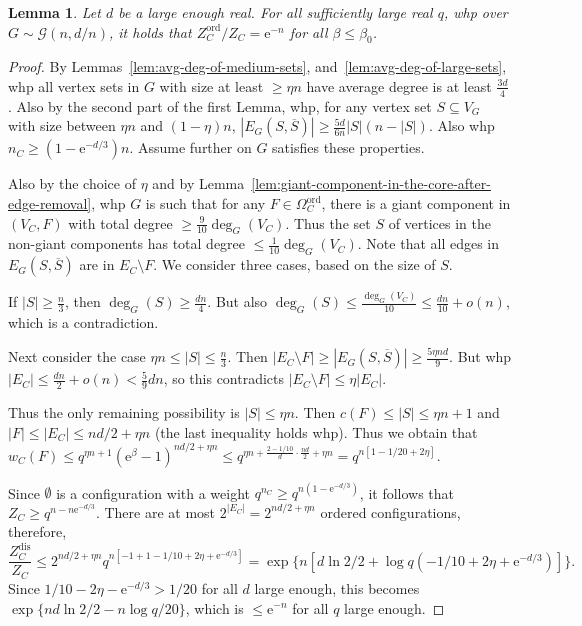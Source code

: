 \documentclass[11pt]{article}
\theoremstyle{plain}
\newtheorem{lemma}[theorem]{Lemma}
\newcommand{\G}{\mathcal{G}}
\newcommand{\emm}{\mathrm{e}}
\newcommand{\1}{\mathbb{1}}
\newcommand{\ord}{\mathrm{ord}}
\newcommand{\dis}{\mathrm{dis}}
\begin{document}
\begin{lemma}\label{lem:ordered-phase-vanishes}
    Let \(d\) be a large enough real. For all sufficiently large real \(q\), whp over \(G\sim\G(n,d/n)\), it holds that \(Z^\ord_C / Z_C = \emm^{-n}\) for all \(\beta \leq \beta_0\).
\end{lemma}
\begin{proof}
    By Lemmas~\ref{lem:avg-deg-of-medium-sets}, and~\ref{lem:avg-deg-of-large-sets}, whp all vertex sets in \(G\) with size at least \(\geq \eta n\) have average degree is at least \(\tfrac{3d}{4}\). Also by the second part of the first Lemma, whp, for any vertex set \(S\subseteq V_G\) with size between \(\eta n\) and \((1-\eta)n\), \(|E_G(S,\overline S)|\geq \frac{5d}{6n}|S|(n-|S|)\). Also whp \(n_C \geq (1-\emm^{-d/3})n\).
    Assume further on \(G\) satisfies these properties.
    
    Also by the choice of \(\eta\) and by Lemma~\ref{lem:giant-component-in-the-core-after-edge-removal}, whp \(G\) is such that for any \(F\in\Omega^\ord_C\), there is a giant component in \((V_C,F)\) with total degree \(\geq \tfrac{9}{10} \deg_G(V_C)\). Thus the set \(S\) of vertices in the non-giant components has total degree \(\leq\tfrac{1}{10}\deg_G(V_C)\). Note that all edges in \(E_G(S,\overline S)\) are in \(E_C\setminus F\).
    We consider three cases, based on the size of \(S\).
    
    If \(|S|\geq\frac{n}{3}\), then \(\deg_G(S)\geq \frac{dn}{4}\). But also \(\deg_G(S)\leq \tfrac{\deg_G(V_C)}{10} \leq \tfrac{dn}{10} + o(n)\), which is a contradiction.

    Next consider the case \(\eta n \leq |S|\leq \tfrac n3\). Then \(|E_C\setminus F|\geq |E_G(S,\overline{S})| \geq \frac{5\eta n d}{9}\). But whp \(|E_C|\leq \frac{dn}{2} + o(n) < \frac{5}{9}dn\), so this contradicts \(|E_C\setminus F|\leq \eta |E_C|\).

    Thus the only remaining possibility is \(|S|\leq\eta n\). Then \(c(F)\leq |S| \leq \eta n + 1\) and \(|F|\leq |E_C|\leq nd/2 + \eta n\) (the last inequality holds whp). Thus we obtain that \(w_C(F)\leq q^{\eta n + 1}(\emm^\beta-1)^{nd / 2 + \eta n} \leq q^{\eta n + \frac{2-1/10}{d}\cdot\frac{nd}{2} + \eta n} = q^{n[1 - 1 / 20 + 2\eta]}\).

    Since \(\emptyset\) is a configuration with a weight \(q^{n_C} \geq q^{n(1-\emm^{-d/3})}\), it follows that \(Z_C\geq q^{n-n\emm^{-d/3}}\). There are at most \(2^{|E_C|} = 2^{nd/2 + \eta n}\) ordered configurations, therefore,
    \[
    \frac{Z^\dis_C}{Z_C}\leq 2^{nd / 2 + \eta n} q^{n[-1 + 1 - 1/ 10 + 2\eta + \emm^{-d/3}]} = \exp\{n[d\ln 2 / 2 + \log q(- 1/ 10 + 2\eta + \emm^{-d/3})]\}.
    \]
    Since \(1/10 - 2\eta - \emm^{-d/3} > 1/20\) for all \(d\) large enough, this becomes \(\exp\{n d\ln 2 / 2 - n\log q/20\}\), which is \(\leq \emm^{-n}\) for all \(q\) large enough.
\end{proof}
\end{document}

